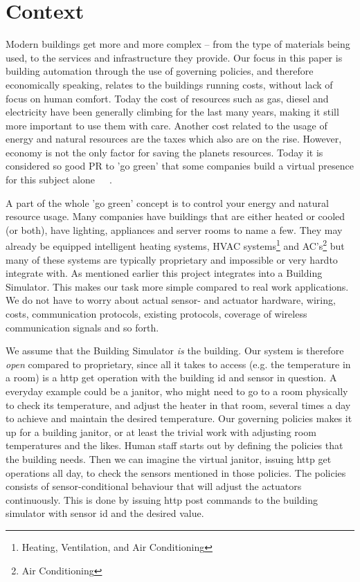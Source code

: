 \section{Context} \label{sec:context}
Modern buildings get more and more complex -- from the type of materials being used, to the services and infrastructure they provide. Our focus in this paper is building automation through the use of governing policies, and therefore economically speaking, relates to the buildings running costs, without lack of focus on human comfort. Today the cost of resources such as gas, diesel and electricity have been generally climbing for the last many years, making it still more important to use them with care. Another cost related to the usage of energy and natural resources are the taxes which also are on the rise. However, economy is not the only factor for saving the planets resources. Today it is considered so good PR to 'go green' that some companies build a virtual presence for this subject alone~\cite{green-google}~\cite{green-facebook}~\cite{green-microsoft}.

A part of the whole 'go green' concept is to control your energy and natural resource usage. Many companies have buildings that are either heated or cooled (or both), have lighting, appliances and server rooms to name a few. They may already be equipped intelligent heating systems, HVAC systems\footnote{Heating, Ventilation, and Air Conditioning} and AC's\footnote{Air Conditioning} but many of these systems are typically proprietary and impossible \textemdash or very hard\textemdash to integrate with. As mentioned earlier this project integrates into a Building Simulator. This makes our task more simple compared to real work applications. We do not have to worry about actual sensor- and actuator hardware, wiring, costs, communication protocols, existing protocols, coverage of wireless communication signals and so forth.

We assume that the Building Simulator \textit{is} the building. Our system is therefore \textit{open} compared to proprietary, since all it takes to access (e.g. the temperature in a room) is a http get operation with the building id and sensor in question. A everyday example could be a janitor, who might need to go to a room physically to check its temperature, and adjust the heater in that room, several times a day to achieve and maintain the desired temperature. Our governing policies makes it up for a building janitor, or at least the trivial work with adjusting room temperatures and the likes. Human staff starts out by defining the policies that the building needs. Then we can imagine the virtual janitor, issuing http get operations all day, to check the sensors mentioned in those policies. The policies consists of sensor-conditional behaviour that will adjust the actuators continuously. This is done by issuing http post commands to the building simulator with sensor id and the desired value.

